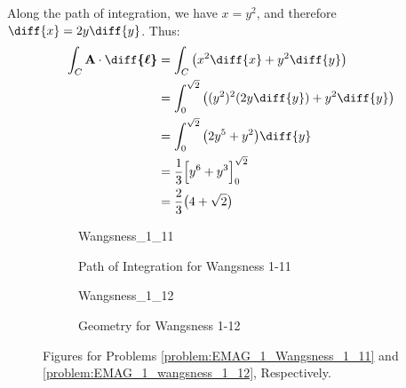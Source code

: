 \documentclass[crop=false,class=book,oneside]{standalone}
\begin{document}
\begin{solution}
                Along the path of integration, we have $x=y^{2}$,
                and therefore $\diff{x}=2y\diff{y}$.
                Thus:
                \begin{subequations}
                    \begin{align}
                        \int_{C}\mathbf{A}
                            \cdot\boldsymbol{\diff{\ell}}
                        &=\int_{C}
                        \big(x^{2}\diff{x}+y^{2}\diff{y}\big)\\
                        &=\int_{0}^{\sqrt{2}}
                         \big(
                            (y^{2})^{2}(2y\diff{y})+y^{2}\diff{y}
                        \big)\\
                        &=\int_{0}^{\sqrt{2}}
                          \big(2y^{5}+y^{2}\big)\diff{y}\\
                        &=\frac{1}{3}
                        \Big[y^{6}+y^{3}\Big]_{0}^{\sqrt{2}}\\
                        &=\frac{2}{3}\big(4+\sqrt{2}\big)
                    \end{align}
                \end{subequations}
            \end{solution}
            \begin{figure}[H]
                \centering
                \captionsetup{type=figure}
                \begin{subfigure}[b]{0.49\textwidth}
                    \centering
                    \captionsetup{type=figure}
                    {Wangsness_1_11}
                    \caption{Path of Integration for Wangsness 1-11}
                    \label{%
                        fig:EMAG_1_path_of_integration_%
                        for_wangsness_1_11%
                    }
                \end{subfigure}
                \begin{subfigure}[b]{0.49\textwidth}
                    \centering
                    \captionsetup{type=figure}
                    {Wangsness_1_12}
                    \caption{Geometry for Wangsness 1-12}
                    \label{fig:EMAG_1_geometry_for_wangsness_1_12}
                \end{subfigure}
                \caption[Figures for Wangsness 1-11 and 1-12]{%
                    Figures for Problems
                    \ref{problem:EMAG_1_Wangsness_1_11} and
                    \ref{problem:EMAG_1_wangsness_1_12}, Respectively.
                }
                \label{fig:EMAG_1_figures_for_wangsness_1_11_and_1_12}
            \end{figure}
\end{document}
